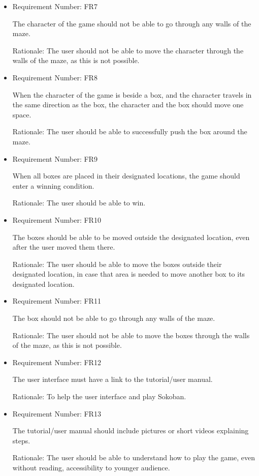 \documentclass[12pt, titlepage]{article}
\begin{document}
\begin{itemize}
\item Requirement Number: FR7

The character of the game should not be able to go through any walls of the maze.

Rationale: The user should not be able to move the character through the walls of the maze, as this is not possible.

\item Requirement Number: FR8

When the character of the game is beside a box, and the character travels in the same direction as the box, the character and the box should move one space.

Rationale: The user should be able to successfully push the box around the maze.

\item Requirement Number: FR9

When all boxes are placed in their designated locations, the game should enter a winning condition.

Rationale: The user should be able to win.

\item Requirement Number: FR10

The boxes should be able to be moved outside the designated location, even after the user moved them there.

Rationale: The user should be able to move the boxes outside their designated location, in case that area is needed to move another box to its designated location.

\item Requirement Number: FR11

The box should not be able to go through any walls of the maze.

Rationale: The user should not be able to move the boxes through the walls of the maze, as this is not possible.

\item Requirement Number: FR12

The user interface must have a link to the tutorial/user manual.

Rationale: To help the user interface and play Sokoban.

\item Requirement Number: FR13

The tutorial/user manual should include pictures or short videos explaining steps.

Rationale: The user should be able to understand how to play the game, even without reading, accessibility to younger audience.


\end{itemize}
\end{document}
